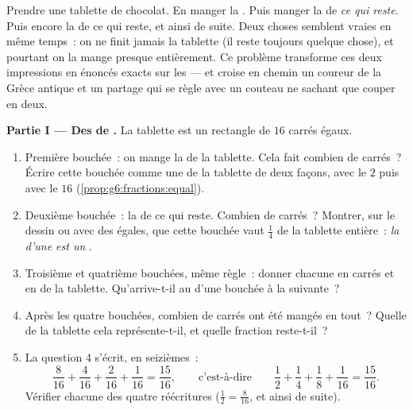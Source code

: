 \begin{problem}
\label{pb:g6:fractions:1}
Prendre une tablette de chocolat. En manger la . Puis manger la
 de \emph{ce qui reste}. Puis encore la  de ce qui reste,
et ainsi de suite. Deux choses semblent vraies en même temps~: on ne
finit jamais la tablette (il reste toujours quelque chose), et
pourtant on la mange presque entièrement. Ce problème transforme ces
deux impressions en énoncés exacts sur les  --- et croise en
chemin un coureur de la Grèce antique et un partage qui se règle avec
un couteau ne sachant que couper en deux.

\medskip
\noindent\textbf{Partie I --- Des  de .}
La tablette est un rectangle de $16$ carrés égaux.
\begin{enumerate}
  \item Première bouchée~: on mange la  de la tablette. Cela
        fait combien de carrés~? Écrire cette bouchée comme une
         de la tablette de deux façons, avec le 
        $2$ puis avec le  $16$
        (\cref{prop:g6:fractions:equal}).
  \item Deuxième bouchée~: la  de ce qui reste. Combien de
        carrés~? Montrer, sur le dessin ou avec des 
        égales, que cette bouchée vaut $\frac14$ de la tablette
        entière~: \emph{la  d'une  est un }.
  \item Troisième et quatrième bouchées, même règle~: donner chacune
        en carrés et en  de la tablette. Qu'arrive-t-il au
         d'une bouchée à la suivante~?
  \item Après les quatre bouchées, combien de carrés ont été mangés
        en tout~? Quelle  de la tablette cela
        représente-t-il, et quelle fraction reste-t-il~?
  \item La question 4 s'écrit, en seizièmes~:
        \[
        \frac{8}{16} + \frac{4}{16} + \frac{2}{16} + \frac{1}{16}
        = \frac{15}{16},
        \qquad\text{c'est-à-dire}\qquad
        \frac12 + \frac14 + \frac18 + \frac{1}{16}
        = \frac{15}{16} .
        \]
        Vérifier chacune des quatre réécritures
        ($\frac12 = \frac{8}{16}$, et ainsi de suite).
\end{enumerate}


\end{problem}
